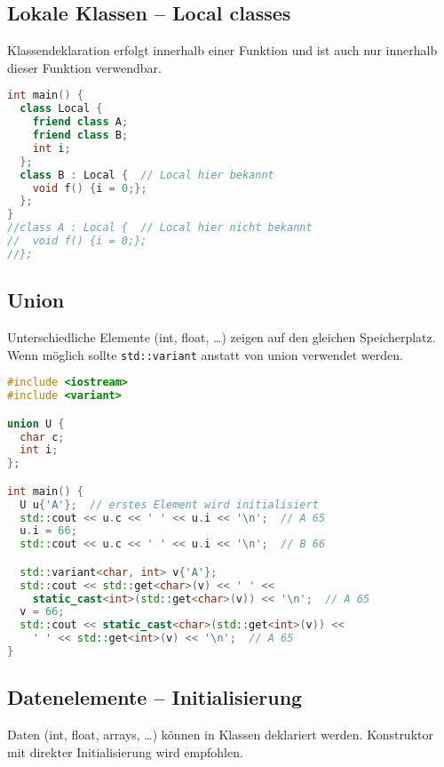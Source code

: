 \subsection{Lokale Klassen -- Local classes}

Klassendeklaration erfolgt innerhalb einer Funktion und ist auch nur innerhalb
dieser Funktion verwendbar.

\begin{lstlisting}[language=C++]
int main() {
  class Local {
    friend class A;
    friend class B;
    int i;
  };
  class B : Local {  // Local hier bekannt
    void f() {i = 0;};
  };
}
//class A : Local {  // Local hier nicht bekannt
//  void f() {i = 0;};
//};
\end{lstlisting}

\subsection{Union}

Unterschiedliche Elemente (int, float, \dots) zeigen auf den gleichen
Speicherplatz. Wenn möglich sollte \lstinline|std::variant| anstatt von union
verwendet werden.

\begin{lstlisting}[language=C++]
#include <iostream>
#include <variant>

union U {
  char c;
  int i;
};

int main() {
  U u{'A'};  // erstes Element wird initialisiert
  std::cout << u.c << ' ' << u.i << '\n';  // A 65
  u.i = 66;
  std::cout << u.c << ' ' << u.i << '\n';  // B 66

  std::variant<char, int> v{'A'};
  std::cout << std::get<char>(v) << ' ' <<
    static_cast<int>(std::get<char>(v)) << '\n';  // A 65
  v = 66;
  std::cout << static_cast<char>(std::get<int>(v)) <<
    ' ' << std::get<int>(v) << '\n';  // A 65
}
\end{lstlisting}

\subsection{Datenelemente -- Initialisierung}
\label{ssec:class.Initialisierung}

Daten (int, float, arrays, \dots) können in Klassen deklariert werden.
Konstruktor mit direkter Initialisierung wird empfohlen.

